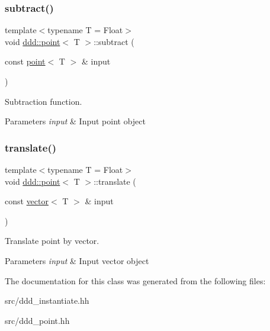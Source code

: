 \subsubsection{\texorpdfstring{subtract()}{subtract()}}
{\footnotesize\ttfamily template$<$typename T = Float$>$ \\
void \hyperlink{classddd_1_1point}{ddd\+::point}$<$ T $>$\+::subtract (\begin{DoxyParamCaption}\item[{const \hyperlink{classddd_1_1point}{point}$<$ T $>$ \&}]{input }\end{DoxyParamCaption})\hspace{0.3cm}{\ttfamily [inline]}}



Subtraction function. 


\begin{DoxyParams}{Parameters}
{\em input} & Input point object \\
\hline
\end{DoxyParams}
\mbox{\label{classddd_1_1point_a36c06fef72376a058c663dd9632ddcd0}} 
\subsubsection{\texorpdfstring{translate()}{translate()}}
{\footnotesize\ttfamily template$<$typename T = Float$>$ \\
void \hyperlink{classddd_1_1point}{ddd\+::point}$<$ T $>$\+::translate (\begin{DoxyParamCaption}\item[{const \hyperlink{classddd_1_1vector}{vector}$<$ T $>$ \&}]{input }\end{DoxyParamCaption})\hspace{0.3cm}{\ttfamily [inline]}}



Translate point by vector. 


\begin{DoxyParams}{Parameters}
{\em input} & Input vector object \\
\hline
\end{DoxyParams}


The documentation for this class was generated from the following files\+:\begin{DoxyCompactItemize}
\item 
src/ddd\+\_\+instantiate.\+hh\item 
src/ddd\+\_\+point.\+hh\end{DoxyCompactItemize}
